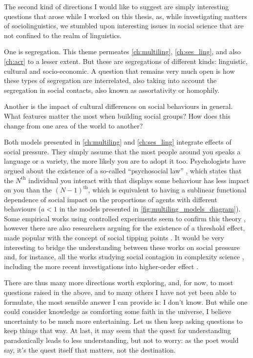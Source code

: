 \documentclass[../thesis.tex]{subfiles}
\begin{document}
The second kind of directions I would like to suggest are simply interesting questions
that arose while I worked on this thesis, as, while investigating matters of
sociolinguistics, we stumbled upon interesting issues in social science that are not
confined to the realm of linguistics.

One is segregation. This theme permeates \cref{ch:multiling},
\cref{ch:ses_ling}, and also \cref{ch:acr} to a lesser extent. But these are
segregations of different kinds: linguistic, cultural and socio-economic. A question
that remains very much open is how these types of segregation are interrelated, also
taking into account the segregation in social contacts, also known as assortativity or
homophily.

Another is the impact of cultural differences on social behaviours in general. What
features matter the most when building social groups? How does this change from one area
of the world to another?

Both models presented in \cref{ch:multiling} and \cref{ch:ses_ling} integrate effects of
social pressure. They simply assume that the most people around you speaks a language or
a variety, the more likely you are to adopt it too. Psychologists have argued about the
existence of a so-called ``psychosocial law'' \cite{LatanePsychologySocial1981}, which
states that the $N^\text{th}$ individual you interact with that displays some behaviour
has less impact on you than the $(N - 1)^\text{th}$, which is equivalent to having a
sublinear functional dependence of social impact on the proportions of agents with
different behaviours ($a < 1$ in the models presented in
\cref{fig:multiling_models_diagram}). Some empirical works using controlled experiments
seem to confirm this theory \cite{GerardConformityGroup1968,MilgramNoteDrawing1969},
however there are also researchers arguing for the existence of a threshold effect, made popular with the concept of social tipping points
\cite{MilkoreitDefiningTipping2018,CentolaExperimentalEvidence2018}. It would be very interesting to bridge the
understanding between these works on social pressure and, for instance, all the works
studying social contagion in complexity science \cite{WattsInfluentialsNetworks2007},
including the more recent investigations into higher-order effect
\cite{IacopiniSimplicialModels2019}.

There are thus many more directions worth exploring, and, for now, to most questions
raised in the above, and to many others I have not yet been able to formulate, the most
sensible answer I can provide is: I don't know. But while one could consider knowledge
as comforting some faith in the universe, I believe uncertainty to be much more
entertaining. Let us then keep asking questions to keep things that way.
At last, it may seem that the quest for understanding paradoxically leads to less
understanding, but not to worry:
as the poet would say,
it's the quest itself that matters, not the destination.
\end{document}

